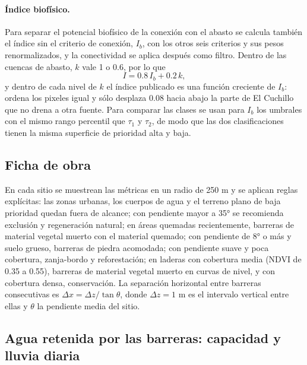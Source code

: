 \documentclass[11pt,letterpaper]{article}
\begin{document}
\paragraph{Índice biofísico.} Para separar el potencial biofísico de la conexión con el abasto se calcula también el índice sin el criterio de conexión, $I_b$, con los otros seis criterios y sus pesos renormalizados, y la conectividad se aplica después como filtro. Dentro de las cuencas de abasto, $k$ vale 1 o 0.6, por lo que
\begin{equation}
I = 0.8\,I_b + 0.2\,k ,
\end{equation}
y dentro de cada nivel de $k$ el índice publicado es una función creciente de $I_b$: ordena los pixeles igual y sólo desplaza 0.08 hacia abajo la parte de El Cuchillo que no drena a otra fuente. Para comparar las clases se usan para $I_b$ los umbrales con el mismo rango percentil que $\tau_1$ y $\tau_2$, de modo que las dos clasificaciones tienen la misma superficie de prioridad alta y baja.

\subsection{Ficha de obra}

En cada sitio se muestrean las métricas en un radio de 250 m y se aplican reglas explícitas: las zonas urbanas, los cuerpos de agua y el terreno plano de baja prioridad quedan fuera de alcance; con pendiente mayor a 35° se recomienda exclusión y regeneración natural; en áreas quemadas recientemente, barreras de material vegetal muerto con el material quemado; con pendiente de 8° o más y suelo grueso, barreras de piedra acomodada; con pendiente suave y poca cobertura, zanja-bordo y reforestación; en laderas con cobertura media (NDVI de 0.35 a 0.55), barreras de material vegetal muerto en curvas de nivel, y con cobertura densa, conservación. La separación horizontal entre barreras consecutivas es $\Delta x = \Delta z/\tan\theta$, donde $\Delta z = 1$ m es el intervalo vertical entre ellas y $\theta$ la pendiente media del sitio.

\subsection{Agua retenida por las barreras: capacidad y lluvia diaria}\label{sec:retencion}
\end{document}
